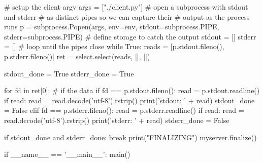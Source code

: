 \begin{codepar}
    # setup the client argv
    args = ["./client.py"]
    # open a subprocess with stdout and stderr
    # as distinct pipes so we can capture their
    # output as the process runs
    p = subprocess.Popen(args, env=env,
        stdout=subprocess.PIPE, stderr=subprocess.PIPE)
    # define storage to catch the output
    stdout = []
    stderr = []
    # loop until the pipes close
    while True:
        reads = [p.stdout.fileno(), p.stderr.fileno()]
        ret = select.select(reads, [], [])

        stdout_done = True
        stderr_done = True

        for fd in ret[0]:
            # if the data
            if fd == p.stdout.fileno():
                read = p.stdout.readline()
                if read:
                    read = read.decode('utf-8').rstrip()
                    print('stdout: ' + read)
                    stdout_done = False
            elif fd == p.stderr.fileno():
                read = p.stderr.readline()
                if read:
                    read = read.decode('utf-8').rstrip()
                    print('stderr: ' + read)
                    stderr_done = False

        if stdout_done and stderr_done:
            break
    print("FINALIZING")
    myserver.finalize()


if __name__ == '__main__':
    main()
\end{codepar}
\pyspecificend
